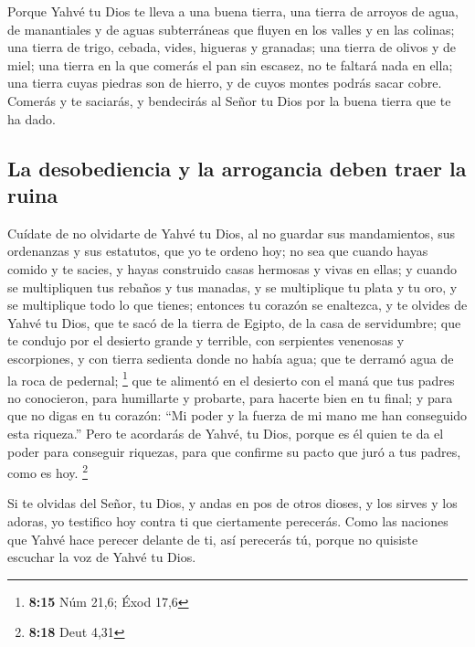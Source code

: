 \begin{paracol}{2}
 Porque Yahvé tu Dios te lleva a una buena tierra, una
tierra de arroyos de agua, de manantiales y de aguas subterráneas que
fluyen en los valles y en las colinas;  una tierra de
trigo, cebada, vides, higueras y granadas; una tierra de olivos y de
miel;  una tierra en la que comerás el pan sin escasez, no
te faltará nada en ella; una tierra cuyas piedras son de hierro, y de
cuyos montes podrás sacar cobre.  Comerás y te saciarás,
y bendecirás al Señor tu Dios por la buena tierra que te ha dado.

\hypertarget{la-desobediencia-y-la-arrogancia-deben-traer-la-ruina}{%
\subsection{La desobediencia y la arrogancia deben traer la
ruina}\label{la-desobediencia-y-la-arrogancia-deben-traer-la-ruina}}

 Cuídate de no olvidarte de Yahvé tu Dios, al no guardar
sus mandamientos, sus ordenanzas y sus estatutos, que yo te ordeno hoy;
 no sea que cuando hayas comido y te sacies, y hayas
construido casas hermosas y vivas en ellas;  y cuando se
multipliquen tus rebaños y tus manadas, y se multiplique tu plata y tu
oro, y se multiplique todo lo que tienes;  entonces tu
corazón se enaltezca, y te olvides de Yahvé tu Dios, que te sacó de la
tierra de Egipto, de la casa de servidumbre;  que te
condujo por el desierto grande y terrible, con serpientes venenosas y
escorpiones, y con tierra sedienta donde no había agua; que te derramó
agua de la roca de pedernal; \footnote{\textbf{8:15} Núm 21,6; Éxod 17,6}
 que te alimentó en el desierto con el maná que tus
padres no conocieron, para humillarte y probarte, para hacerte bien en
tu final;  y para que no digas en tu corazón: ``Mi poder
y la fuerza de mi mano me han conseguido esta riqueza.'' 
Pero te acordarás de Yahvé, tu Dios, porque es él quien te da el poder
para conseguir riquezas, para que confirme su pacto que juró a tus
padres, como es hoy. \footnote{\textbf{8:18} Deut 4,31}

 Si te olvidas del Señor, tu Dios, y andas en pos de
otros dioses, y los sirves y los adoras, yo testifico hoy contra ti que
ciertamente perecerás.  Como las naciones que Yahvé hace
perecer delante de ti, así perecerás tú, porque no quisiste escuchar la
voz de Yahvé tu Dios.


\end{paracol}
